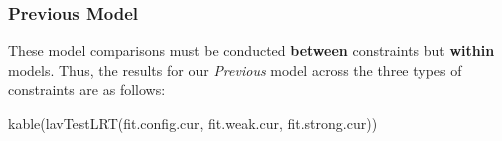 \documentclass[
  letterpaper,
  DIV=11,
  numbers=noendperiod]{scrartcl}
\newenvironment{Shaded}{\begin{snugshade}}{\end{snugshade}}
\newcommand{\FunctionTok}[1]{\textcolor[rgb]{0.28,0.35,0.67}{#1}}
\newcommand{\NormalTok}[1]{\textcolor[rgb]{0.00,0.23,0.31}{#1}}
\begin{document}
\subsubsection{Previous Model}\label{previous-model}

These model comparisons must be conducted \textbf{between} constraints
but \textbf{within} models. Thus, the results for our \emph{Previous}
model across the three types of constraints are as follows:

\begin{Shaded}
\begin{Highlighting}[]
\FunctionTok{kable}\NormalTok{(}\FunctionTok{lavTestLRT}\NormalTok{(fit.config.cur, }
\NormalTok{                 fit.weak.cur, }
\NormalTok{                 fit.strong.cur))}
\end{Highlighting}
\end{Shaded}
\end{document}
